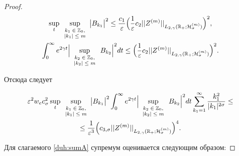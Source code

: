 \begin{proof}
\begin{gather}

\sup_{t}\sup_{\scriptsize \begin{array}{c} k_1\in \mathbb Z_0, \\ |k_1|\le m \end{array}}

\bigl|B_{k_1}\bigr|^2\le \frac{c_1}{\varepsilon} \Bigl(\frac1\varepsilon c_2 ||Z^{(m)} ||_{L_{2,\gamma}(\mathbb R_{+};{\cal H}^{(m)}_{\sigma})}\Bigr)^2,

\label{duh:B_{k_1}}

\\

\int_0^\infty e^{2\gamma t} \Bigl| \sup_{\scriptsize \begin{array}{c} k_2\in \mathbb Z_0, \\ |k_2|\le m \end{array}}B_{k_2} \Bigr|^2dt\le \Bigl(\frac1\varepsilon c_2 ||Z^{(m)} ||_{L_{2,\gamma}(\mathbb R_{+};{\cal H}^{(m)}_{\sigma})}\Bigr)^2.

\label{duh:B_{k_2}}

\end{gather}

Отсюда следует

\begin{multline*}

\varepsilon^2 w_e c_\sigma^2 \sup_{t}\sup_{\scriptsize \begin{array}{c} k_1\in \mathbb Z_0, \\ |k_1|\le m \end{array}} \bigl|B_{k_1}\bigr|^2




\int_0^\infty e^{2\gamma t} \Bigl| \sup_{\scriptsize \begin{array}{c} k_2\in \mathbb Z_0, \\ |k_2|\le m \end{array}}B_{k_2}\Bigr|^2dt\sum_{k_1=1}^{\infty}  \frac{k_1^2}{|k_1|^{2\sigma}}\le

\\

\le \frac{1}{\varepsilon^3}\Bigl(c_{3,\sigma} ||Z^{(m)} ||_{L_{2,\gamma}(\mathbb R_{+};{\cal H}^{(m)}_{\sigma})}\Bigr)^4.

\end{multline*}

Для слагаемого \eqref{duh:sumA} супремум оценивается следующим образом:


\end{proof}
